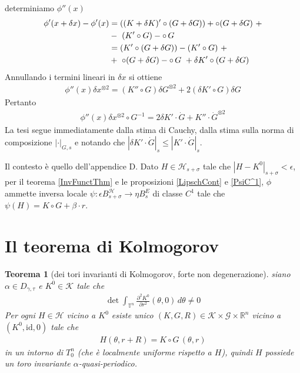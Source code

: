 \documentclass[twoside, 11pt]{amsbook}
\makeatletter
\newcommand{\0}{{(0)}}
\newcommand{\3}{{(3)}}
\theoremstyle{colonplain}
\newtheorem{thm}{Teorema}[chapter]
\theoremstyle{colondefinition}
\theoremstyle{colonremark}
\numberwithin{equation}{chapter}
\renewcommand{\proofname}{Dimostrazione}
\renewenvironment{proof}[1][\proofname]{\par
  \pushQED{\qed}%
  \normalfont \topsep6\p@\@plus6\p@\relax
  \trivlist
  \item[\hskip\labelsep\bfseries #1:]\ignorespaces
}{%
  \popQED\endtrivlist\@endpefalse
}
\makeatother
\begin{document}
\begin{proof} determiniamo $\phi''(x)$
\begin{align}
    \phi'(x + \delta x) - \phi'(x) &= ((K + \delta K)' \circ (G + \delta G)) + \circ (G + \delta G) \ + \notag \\
    &- \ (K' \circ G) - \circ \, G \notag \\
    &= (K' \circ (G + \delta G)) - (K' \circ G) \ + \notag \\
    &+ \ \circ (G + \delta G) - \circ \, G \ + \delta K ' \circ (G + \delta G)
\end{align}
Annullando i termini lineari in $\delta x$ si ottiene
\begin{align}
    \phi''(x)\delta x^{\otimes 2} = (K'' \circ G)\delta G^{\otimes 2} + 2(\delta K' \circ G)\delta G
\end{align}
Pertanto
\begin{align}
    \phi''(x)\delta x^{\otimes 2} \circ G^{-1} = 2\delta K' \cdot \dot{G} + K'' \cdot \dot{G}^{\otimes 2}
\end{align}
La tesi segue immediatamente dalla stima di Cauchy, dalla stima sulla norma di composizione $|\cdot|_{G, s}$ e notando che $|\delta K' \cdot \dot{G}|_s \leq |K' \cdot \dot{G}|_s$.
\end{proof}
\begin{proof}[Dimostrazione del teorema di Herman \ref{TwistThmHerman2}]
Il contesto è quello dell'appendice D. Dato $H \in \mathcal{H}_{s + \sigma}$ tale che $|H - K^0|_{s + \sigma} < \epsilon$, per il teorema \eqref{InvFunctThm} e le proposizioni \eqref{LipschCont} e \eqref{PsiC^1}, $\phi$ ammette inversa locale $\psi : \epsilon B^\mathcal{H}_{s + \sigma} \longrightarrow \eta B^{E}_s$ di classe $C^1$ tale che $\psi(H) = K \circ G + \beta \cdot r$.
\end{proof}

\section{Il teorema di Kolmogorov}
\begin{thm}[dei tori invarianti di Kolmogorov, forte non degenerazione]\label{KolmThmStrongNonDeg} siano $\alpha \in D_{\gamma, \tau}$ e $K^0 \in \mathcal{K}$ tale che
\begin{align}
    \det \int_{\mathbb{T}^n} \frac{\partial^2 K^0}{\partial r^2}(\theta, 0) \, d\theta \neq 0 
\end{align}
Per ogni $H \in \mathcal{H}$ vicino a $K^0$ esiste unico $(K, G, R) \in \mathcal{K} \times \mathcal{G} \times \mathbb{R}^n$ vicino a $(K^0, \mathrm{id}, 0)$ tale che
\begin{align}
    H(\theta, r + R) = K \circ G \, (\theta, r) 
\end{align}
in un intorno di $T^n_0$ (che è localmente uniforme rispetto a $H$), quindi $H$ possiede un toro invariante $\alpha$-quasi-periodico.
\end{thm}
\end{document}

